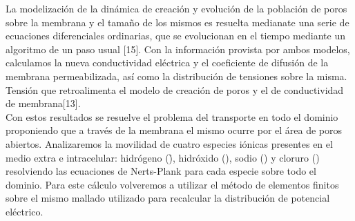 La modelización de la dinámica de creación y evolución de la población de poros sobre la membrana y el tamaño de los mismos es resuelta medianate una serie de ecuaciones diferenciales ordinarias, que se evolucionan en el tiempo mediante un algoritmo de un paso usual [15]. Con la información provista por ambos modelos, calculamos la nueva conductividad eléctrica y el coeficiente de difusión de la membrana permeabilizada, así como la distribución de tensiones sobre la misma. Tensión que retroalimenta el modelo de creación de poros y el de conductividad de membrana[13]. \\

Con estos resultados se resuelve el problema del transporte en todo el dominio proponiendo que a través de la membrana el mismo ocurre por el área de poros abiertos. Analizaremos la movilidad de cuatro especies iónicas presentes en el medio extra e intracelular: hidrógeno (\h), hidróxido (\oh), sodio (\na) y cloruro (\cl) resolviendo las ecuaciones de Nerts-Plank para cada especie sobre todo el dominio. Para este cálculo volveremos a utilizar el método de elementos finitos sobre el mismo mallado utilizado para recalcular la distribución de potencial eléctrico.\\

